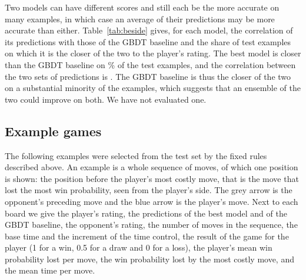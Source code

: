 \documentclass[11pt]{article}
\begin{document}
Two models can have different scores and still each be the more accurate on
many examples, in which case an average of their predictions may be more
accurate than either. Table~\ref{tab:beside} gives, for each model, the
correlation of its predictions with those of the GBDT baseline and the share
of test examples on which it is the closer of the two to the player's
rating. The best model is closer than the GBDT baseline on
\% of the test examples, and the correlation between
the two sets of predictions is . The GBDT baseline
is thus the closer of the two on a substantial minority of the examples,
which suggests that an ensemble of the two could improve on both. We have not
evaluated one.

\begin{table}[htbp]\centering\small
{}
\caption{Agreement with the GBDT baseline on the test set: the correlation
between the two models' predictions, and the share of examples on which the
model is closer to the player's rating than the baseline.}
\label{tab:beside}
\end{table}

\subsection{Example games}
\label{sec:positions}

The following examples were selected from the test set by the fixed rules
described above. An example is a whole sequence of moves, of which one
position is shown: the position before the player's most costly move, that
is the move that lost the most win probability, seen from the player's side.
The grey arrow is the opponent's preceding move and the blue arrow is the
player's move. Next to each board we give the player's rating, the
predictions of the best model and of the GBDT baseline, the opponent's
rating, the number of moves in the sequence, the base time and the increment
of the time control, the result of the game for the player (1 for a win, 0.5
for a draw and 0 for a loss), the player's mean win probability lost per
move, the win probability lost by the most costly move, and the mean time per
move.
\end{document}

